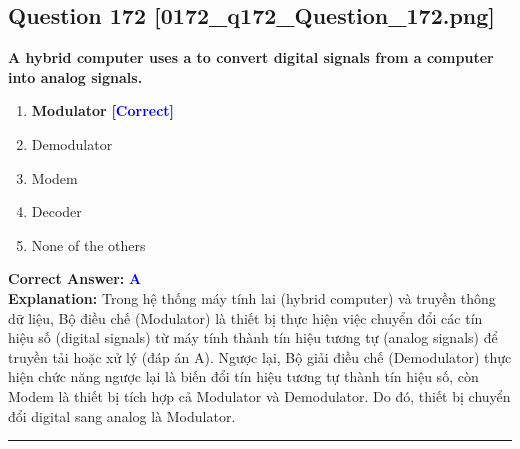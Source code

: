\documentclass[11pt,a4paper]{article}
\begin{document}
\begin{minipage}{\textwidth}
\subsection*{Question 172 \quad \footnotesize{[0172\_q172\_Question\_172.png]}}
\noindent \textbf{A hybrid computer uses a to convert digital signals from a computer into analog signals.}

\begin{enumerate}[label=\Alph*.]
    \item \textbf{Modulator} \hfill \textcolor{blue}{\textbf{[Correct]}}
    \item Demodulator
    \item Modem
    \item Decoder
    \item None of the others
\end{enumerate}

\noindent \textbf{Correct Answer:} \textcolor{blue}{\textbf{A}} \\[2pt]
\noindent \textbf{Explanation:} Trong hệ thống máy tính lai (hybrid computer) và truyền thông dữ liệu, Bộ điều chế (Modulator) là thiết bị thực hiện việc chuyển đổi các tín hiệu số (digital signals) từ máy tính thành tín hiệu tương tự (analog signals) để truyền tải hoặc xử lý (đáp án A). Ngược lại, Bộ giải điều chế (Demodulator) thực hiện chức năng ngược lại là biến đổi tín hiệu tương tự thành tín hiệu số, còn Modem là thiết bị tích hợp cả Modulator và Demodulator. Do đó, thiết bị chuyển đổi digital sang analog là Modulator.

\par\vspace{0.3cm}
\hrule
\vspace{0.3cm}
\end{minipage}
\end{document}
